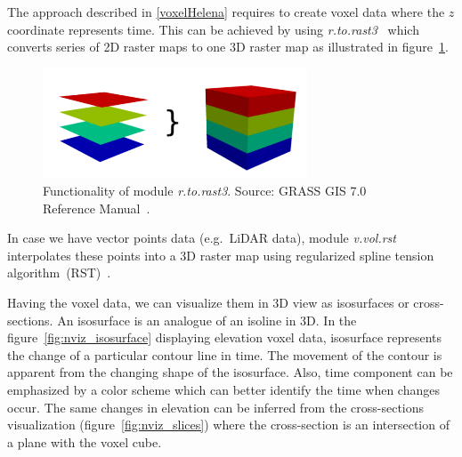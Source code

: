 \documentclass[a4paper,12pt,oneside]{book}
\newcommand{\module}[1]{\textsl{#1}}
\begin{document}
The approach described in \ref{voxelHelena} requires to create voxel data
where the $z$ coordinate represents time.
This can be achieved by using \module{r.to.rast3}~\cite{grassUserMan}
which converts series of 2D raster maps to one 3D raster map as illustrated in figure~\ref{fig:rtorast3}.

\begin{figure}[h!]
  \centering
  \includegraphics[width=0.7\textwidth]{./images/rtorast3.png}
  \caption[Functionality of module \module{r.to.rast3}]
  {Functionality of module \module{r.to.rast3}. Source: GRASS GIS 7.0 Reference Manual~\cite{grassUserMan}.}
  \label{fig:rtorast3}
\end{figure}

In case we have vector points data (e.g.\ LiDAR data), module \module{v.vol.rst} interpolates these points into a 3D raster
map using regularized spline tension algorithm~(RST)~\cite{mitasova1993interpolation,mitasova1993interpolation2}.

Having the voxel data, we can visualize them in 3D view as isosurfaces
or cross-sections. An isosurface is an analogue of an isoline in 3D.
In the figure~\ref{fig:nviz_isosurface} displaying elevation voxel data,
isosurface represents the change of a particular contour line in time.
The movement of the contour is apparent from the changing shape of the isosurface.
Also, time component can be emphasized by a color scheme which can better identify the time when changes occur.
The same changes in elevation can be inferred from the cross-sections visualization (figure~\ref{fig:nviz_slices})
where the cross-section is an intersection of a plane with the voxel cube.
\end{document}
